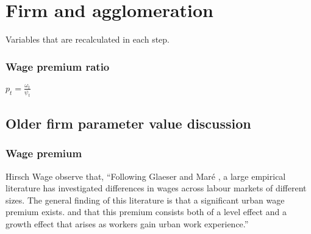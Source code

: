 
\section{Firm and agglomeration}

Variables that are recalculated in each step.


\subsubsection{Wage premium ratio}

$p_t= \frac{\omega_t}{\psi_t}$ 

\subsection{Older firm parameter value discussion}



\subsubsection{Wage premium} \label{section-wage-premium}

Hirsch Wage \cite{hirschUrbanWagePremium2019} observe that, ``Following Glaeser and Maré \cite{glaeserCitiesSkills2001},  a  large  empirical  literature  has  investigated differences in wages across labour markets of different sizes. The general finding of this literature is that a significant urban wage premium exists. and that this premium consists both of a level effect and a growth effect that arises as workers gain urban work experience.'' 

